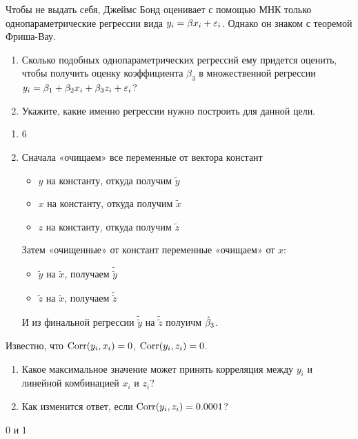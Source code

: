\begin{problem} %
Чтобы не выдать себя, Джеймс Бонд оценивает с помощью МНК только однопараметрические регрессии вида $y_i=\beta x_i + \varepsilon_i$. Однако он знаком с теоремой Фриша-Вау.
\begin{enumerate}
\item Сколько подобных однопараметрических регрессий ему придется оценить, чтобы получить оценку коэффициента $\beta_3$ в множественной регрессии $y_i = \beta_1 + \beta_2 x_i + \beta_3 z_i + \varepsilon_i$?
\item Укажите, какие именно регрессии нужно построить для данной цели.
\end{enumerate}

\begin{sol}
\begin{enumerate}
\item 6
\item Сначала «очищаем» все переменные от вектора констант
\begin{itemize}
  \item $y$ на константу, откуда получим $\tilde{y}$
  \item $x$ на константу, откуда получим $\tilde{x}$
  \item $z$ на константу, откуда получим $\tilde{z}$
\end{itemize}
Затем «очищенные» от констант переменные «очищаем» от $x$:
\begin{itemize}
  \item $\tilde{y}$ на $\tilde{x}$, получаем $\tilde\tilde{y}$
  \item $\tilde{z}$ на $\tilde{x}$, получаем $\tilde\tilde{z}$
\end{itemize}
И из финальной регрессии $\tilde{\tilde{y}}$ на $\tilde{\tilde{z}}$ полуичм $\hat{\beta}_3$.
\end{enumerate}
\end{sol}
\end{problem}

\begin{problem}
Известно, что $\operatorname{Corr}(y_i, x_i)=0$, $\operatorname{Corr}(y_i, z_i)=0$.
\begin{enumerate}
\item Какое максимальное значение может принять корреляция между $y_i$ и линейной комбинацией $x_i$ и $z_i$?
\item Как изменится ответ, если $\operatorname{Corr}(y_i, z_i)=0.0001$?
\end{enumerate}


\begin{sol}
$0$ и $1$
\end{sol}
\end{problem}


